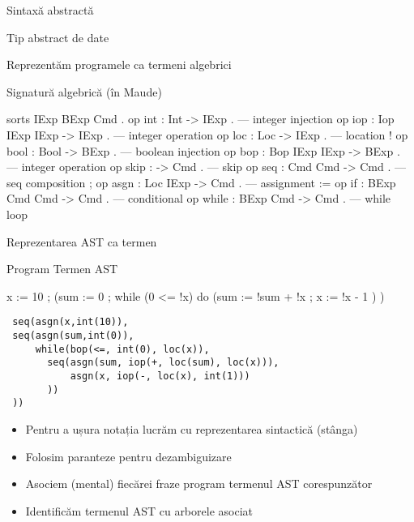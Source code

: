 \begin{section}{Sintaxă abstractă}
\begin{subsection}{Tip abstract de date}

\begin{frame}[fragile]{}{Reprezentăm programele ca termeni algebrici}
\begin{block}{Signatură algebrică (în Maude)}
\begin{asciik}
  sorts IExp BExp Cmd . 
  op int : Int -> IExp .                   --- integer injection
  op iop : Iop IExp IExp -> IExp .	        --- integer operation 
  op loc : Loc -> IExp .                   --- location !
  op bool : Bool -> BExp .                 --- boolean injection
  op bop : Bop IExp IExp -> BExp .         --- integer operation 
  op skip : -> Cmd .                       --- skip
  op seq : Cmd Cmd -> Cmd .                --- seq composition ;
  op asgn : Loc IExp -> Cmd .              --- assignment :=
  op if : BExp Cmd Cmd -> Cmd .            --- conditional
  op while : BExp Cmd -> Cmd .             --- while loop
\end{asciik}
\end{block}
\end{frame}

\begin{frame}[fragile]{Reprezentarea AST ca termen}
\begin{block}{Program\hspace{8em} Termen AST}
\begin{minipage}{.3\columnwidth}
\begin{asciic}
 x := 10 ;
(sum := 0 ;
 while (0 <= !x)  do 
   (sum := !sum + !x ;
    x := !x - 1
   )
 )
\end{asciic}
\end{minipage}\hfill
\begin{minipage}{.64\columnwidth}
\footnotesize
\begin{verbatim}
 seq(asgn(x,int(10)),
 seq(asgn(sum,int(0)),
     while(bop(<=, int(0), loc(x)),
       seq(asgn(sum, iop(+, loc(sum), loc(x))),
           asgn(x, iop(-, loc(x), int(1)))
       ))
 ))
\end{verbatim}
\end{minipage}
\end{block}
\begin{itemize}
\item Pentru a ușura notația lucrăm cu reprezentarea sintactică (stânga)
\item Folosim paranteze pentru dezambiguizare
\item Asociem (mental) fiecărei fraze program termenul AST corespunzător
\item Identificăm termenul AST cu arborele asociat
\end{itemize}
\end{frame}
\end{subsection}
\end{section}

